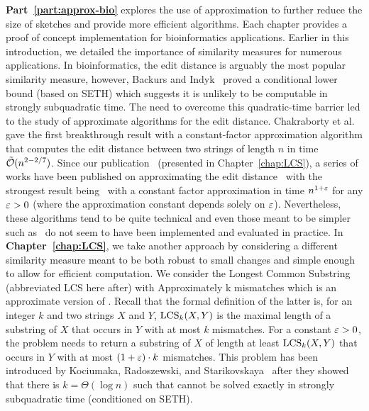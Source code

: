 \textbf{Part~\ref{part:approx-bio}} explores the use of approximation to further reduce the size of sketches and provide more efficient algorithms. Each chapter provides a proof of concept implementation for bioinformatics applications.
%
Earlier in this introduction, we detailed the importance of similarity measures for numerous applications.
In bioinformatics, the edit distance is arguably the most popular similarity measure, however, Backurs and Indyk~\cite{DBLP:conf/stoc/BackursI15} proved a conditional lower bound (based on SETH) which suggests it is unlikely to be computable in strongly subquadratic time.
The need to overcome this quadratic-time barrier led to the study of approximate algorithms for the edit distance. Chakraborty et al.~\cite{DBLP:conf/focs/ChakrabortyDGKS18} gave the first breakthrough result with a constant-factor approximation algorithm that computes the edit distance between two strings of length $n$ in time $\tilde{\mathcal{O}}(n^{2-2/7})$.
Since our publication~\cite{DBLP:conf/cpm/GourdelKRS20} (presented in Chapter~\ref{chap:LCS}), a series of works have been published on approximating the edit distance~\cite{brakensiek2020constant,koucky2020constant} with the strongest result being~\cite{andoni2020edit} with a constant factor approximation in time $n^{1+\varepsilon}$ for any $\varepsilon>0$ (where the approximation constant depends solely on $\varepsilon$).
Nevertheless, these algorithms tend to be quite technical and even those meant to be simpler such as~\cite{andoni2020simple} do not seem to have been implemented and evaluated in practice.
In \textbf{Chapter~\ref{chap:LCS}}, we take another approach by considering a different similarity measure meant to be both robust to small changes and simple enough to allow for efficient computation. We consider the Longest Common Substring (abbreviated LCS here after) with Approximately k mismatches which is an approximate version of \kLCS. Recall that the formal definition of the latter is, for an integer $k$ and two strings $X$ and $Y$, $\mathrm{LCS}_{k}(X,Y)$ is the maximal length of a substring of $X$ that occurs in $Y$ with at most $k$ mismatches.
For a constant $\varepsilon > 0$, the \kApproxLCS problem needs to return a substring of $X$ of length at least $\mathrm{LCS}_{k}(X,Y)$ that occurs in $Y$ with at most $(1+\varepsilon) \cdot k$ mismatches. This problem has been introduced by Kociumaka, Radoszewski, and Starikovskaya~\cite{DBLP:journals/algorithmica/KociumakaRS19} after they showed that there is $k=\Theta(\log n)$ such that \kLCS cannot be solved exactly in strongly subquadratic time (conditioned on SETH).
